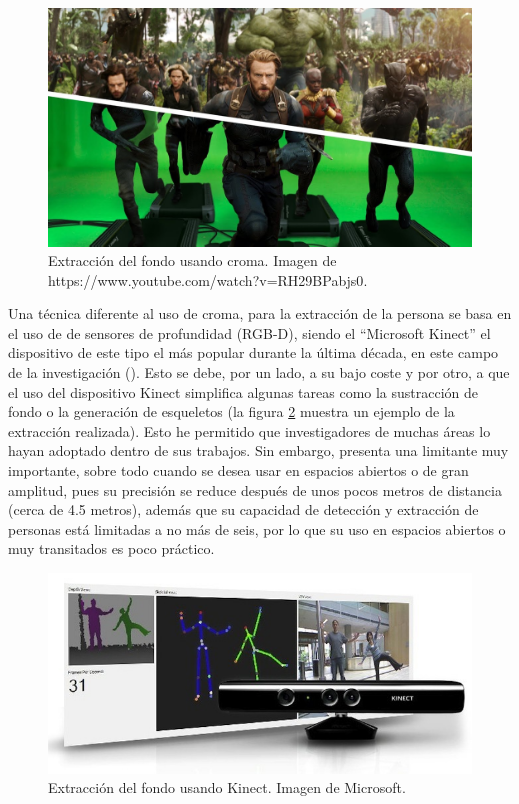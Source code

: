         \begin{figure}[ht!]
        	\centering
        	\includegraphics[width=0.8\linewidth]{imgs/02-Referential/02-Croma.jpg}
        	\caption[Extracción del fondo usando croma]{Extracción del fondo usando croma. Imagen de {https://www.youtube.com/watch?v=RH29BPabjs0}.}
    	    \label{fig:croma}
        \end{figure}%
        
        Una técnica diferente al uso de croma, para la extracción de la persona se basa en el uso de de sensores de profundidad (RGB-D), siendo el ``Microsoft Kinect'' el dispositivo de este tipo el más popular durante la última década, en este campo de la investigación (\cite{Adhikari2017, Lin2016, Stone2015, Galna2014}). Esto se debe, por un lado, a su bajo coste y por otro, a que el uso del dispositivo Kinect simplifica algunas tareas como la sustracción de fondo o la generación de esqueletos (la figura \ref{fig:KinectForWindows} muestra un ejemplo de la extracción realizada). Esto he permitido que investigadores de muchas áreas lo hayan adoptado dentro de sus trabajos. Sin embargo, presenta una limitante muy importante, sobre todo cuando se desea usar en espacios abiertos o de gran amplitud, pues su precisión se reduce después de unos pocos metros de distancia \cite{Fan2017} (cerca de 4.5 metros), además que su capacidad de detección y extracción de personas está limitadas a no más de seis, por lo que su uso en espacios abiertos o muy transitados es poco práctico.
        
        \begin{figure}[ht!]
        	\centering
        	\includegraphics[width=0.8\linewidth]{imgs/02-Referential/02-kinect-windows.jpg}
        	\caption[Extracción del fondo usando Kinect]{Extracción del fondo usando Kinect. Imagen de Microsoft.}
    	    \label{fig:KinectForWindows}
        \end{figure}%
        
